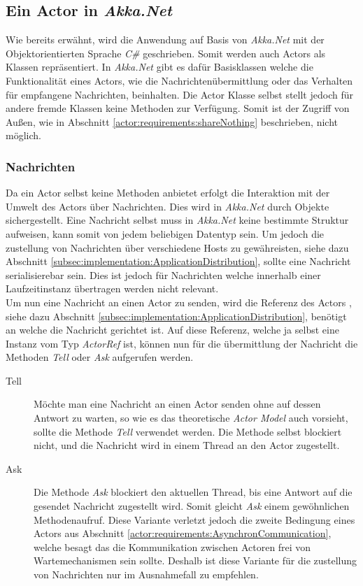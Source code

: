 \subsection{Ein Actor in \textit{Akka.Net}}
Wie bereits erwähnt, wird die Anwendung auf Basis von \textit{Akka.Net} mit der Objektorientierten Sprache \textit{C\#} geschrieben. Somit werden auch Actors als Klassen repräsentiert. In \textit{Akka.Net} gibt es dafür Basisklassen welche die Funktionalität eines Actors, wie die Nachrichtenübermittlung oder das Verhalten für empfangene Nachrichten, beinhalten. Die Actor Klasse selbst stellt jedoch für andere fremde Klassen  keine Methoden zur Verfügung. Somit ist der Zugriff von Außen, wie in Abschnitt \ref{actor:requirements:shareNothing} beschrieben, nicht möglich. \\

\subsubsection{Nachrichten}\label{subsec:implementation:akkaMessaging}
Da ein Actor selbst keine Methoden anbietet erfolgt die Interaktion mit der Umwelt des Actors über Nachrichten. Dies wird in \textit{Akka.Net} durch Objekte sichergestellt. Eine Nachricht selbst muss in \textit{Akka.Net} keine bestimmte Struktur aufweisen, kann somit von jedem beliebigen Datentyp sein. Um jedoch die zustellung von Nachrichten über verschiedene Hosts zu gewähreisten, siehe dazu Abschnitt \ref{subsec:implementation:ApplicationDistribution}, sollte eine Nachricht serialisierebar sein. Dies ist jedoch für Nachrichten welche innerhalb einer Laufzeitinstanz übertragen werden nicht relevant. \\
Um nun eine Nachricht an einen Actor zu senden, wird die Referenz des Actors , siehe dazu Abschnitt \ref{subsec:implementation:ApplicationDistribution}, benötigt an welche die Nachricht gerichtet ist. Auf diese Referenz, welche ja selbst eine Instanz vom Typ \textit{ActorRef} ist, können nun für die übermittlung der Nachricht die Methoden \textit{Tell} oder \textit{Ask} aufgerufen werden.
\begin{description}
    \item[Tell] Möchte man eine Nachricht an einen Actor senden ohne auf dessen Antwort zu warten, so wie es das theoretische \textit{Actor Model} auch vorsieht, sollte die Methode \textit{Tell} verwendet werden. Die Methode selbst blockiert nicht, und die Nachricht wird in einem Thread an den Actor zugestellt. 
    \item[Ask] Die Methode \textit{Ask} blockiert den aktuellen Thread, bis eine Antwort auf die gesendet Nachricht zugestellt wird. Somit gleicht \textit{Ask} einem gewöhnlichen Methodenaufruf. Diese Variante verletzt jedoch die zweite Bedingung eines Actors aus Abschnitt \ref{actor:requirements:AsynchronCommunication}, welche besagt das die Kommunikation zwischen Actoren frei von Wartemechanismen sein sollte. Deshalb ist diese Variante für die zustellung von Nachrichten nur im Ausnahmefall zu empfehlen.  
\end{description}
